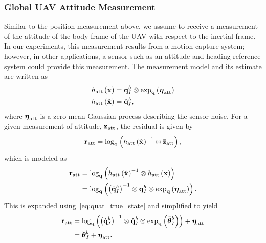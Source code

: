 \subsubsection{Global UAV Attitude Measurement}
Similar to the position measurement above, we assume to receive a measurement of
the attitude of the body frame of the UAV with respect to the inertial frame.
In our experiments, this measurement results from a motion capture system;
however, in other applications, a sensor such as an attitude and heading
reference system could provide this measurement.
The measurement model and its estimate are
written as
\begin{align}
  h_{\text{att}} \left( \boldsymbol{\mathrm{x}} \right) &= \boldsymbol{\mathrm{q}}_{I}^b \otimes \exp_{\boldsymbol{\mathrm{q}}} \left(
  \boldsymbol{\mathrm{\eta}}_{\text{att}} \right) \\
    h_{\text{att}} \left( \hat{\boldsymbol{\mathrm{x}}} \right) &= \hat{\boldsymbol{\mathrm{q}}}_{I}^b,
\end{align}
where $\boldsymbol{\mathrm{\eta}}_{\text{att}}$ is a zero-mean Gaussian process
describing the sensor noise.
For a given measurement of attitude, $\bar{\boldsymbol{\mathrm{z}}}_{\text{att}}$, the residual is
given by
\begin{equation}
  \boldsymbol{\mathrm{r}}_{\text{att}} = \log_{\boldsymbol{\mathrm{q}}} \left(  h_{\text{att}} \left(
  \hat{\boldsymbol{\mathrm{x}}} \right)^{-1} \otimes \bar{\boldsymbol{\mathrm{z}}}_{\text{att}} \right),
\end{equation}
which is modeled as
\begin{align}
  \boldsymbol{\mathrm{r}}_{\text{att}} &= \log_{\boldsymbol{\mathrm{q}}} \left(  h_{\text{att}} \left(
  \hat{\boldsymbol{\mathrm{x}}} \right)^{-1} \otimes h_{\text{att}} \left( \boldsymbol{\mathrm{x}} \right) \right) \\
                        &= \log_{\boldsymbol{\mathrm{q}}} \left(  \left(
  \hat{\boldsymbol{\mathrm{q}}}_{I}^b \right)^{-1} \otimes \boldsymbol{\mathrm{q}}_{I}^b \otimes \exp_{\boldsymbol{\mathrm{q}}} \left(
  \boldsymbol{\mathrm{\eta}}_{\text{att}} \right)\right).
\end{align}
This is expanded using~\eqref{eq:quat_true_state} and simplified to yield
\begin{align}
  \boldsymbol{\mathrm{r}}_{\text{att}}
                        &= \log_{\boldsymbol{\mathrm{q}}} \left(  \left(
                        \hat{\boldsymbol{\mathrm{q}}}_{I}^b \right)^{-1} \otimes
                        \hat{\boldsymbol{\mathrm{q}}}_{I}^b \otimes \exp_{\boldsymbol{\mathrm{q}}} \left(
                      \tilde{\boldsymbol{\mathrm{\theta}}}_I^b \right) \right)
                          + \boldsymbol{\mathrm{\eta}}_{\text{att}}  \\
                        &= \tilde{\boldsymbol{\mathrm{\theta}}}_I^b
                          + \boldsymbol{\mathrm{\eta}}_{\text{att}}. 
\end{align}
